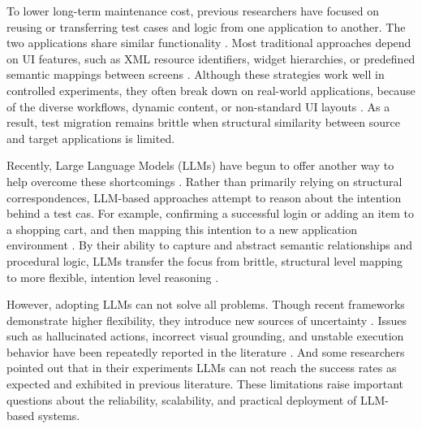 \documentclass[acmsmall,nonacm]{acmart}
\begin{document}
To lower long-term maintenance cost, previous researchers have focused on reusing or transferring test cases and logic from one application to another. The two applications share similar functionality \cite{8952228,10.1145/3650212.3680327}. Most traditional approaches depend on UI features, such as XML resource identifiers, widget hierarchies, or predefined semantic mappings between screens \cite{10.1145/3236024.3236055,8952228}. Although these strategies work well in controlled experiments, they often break down on real-world applications, because of the diverse workflows, dynamic content, or non-standard UI layouts \cite{8952228,10.1145/3650212.3680327}. As a result, test migration remains brittle when structural similarity between source and target applications is limited.

Recently, Large Language Models (LLMs) have begun to offer another way to help overcome these shortcomings \cite{10.1145/3728975,10.1145/3728978,10.1145/3236024.3236055,zhang2024surveylargelanguagemodels}. Rather than primarily relying on structural correspondences, LLM-based approaches attempt to reason about the intention behind a test cas. For example, confirming a successful login or adding an item to a shopping cart, and then mapping this intention to a new application environment \cite{10.1145/3728975,10.1145/3728978,10.1145/3726525}. By their ability to capture and abstract semantic relationships and procedural logic, LLMs transfer the focus from brittle, structural level mapping to more flexible, intention level reasoning \cite{10.1145/3728975,10.1145/3236024.3236055,zhang2024surveylargelanguagemodels}.

However, adopting LLMs can not solve all problems. Though recent frameworks demonstrate higher flexibility, they introduce new sources of uncertainty \cite{li2025reusedroidvlmempoweredandroidui,wang2024softwaretestinglargelanguage}. Issues such as hallucinated actions, incorrect visual grounding, and unstable execution behavior have been repeatedly reported in the literature \cite{baechler2024screenaivisionlanguagemodelui,li2025reusedroidvlmempoweredandroidui,wang2024softwaretestinglargelanguage,zhang2025largelanguagemodelbrainedgui}. And some researchers pointed out that in their experiments LLMs can not reach the success rates as expected and exhibited in previous literature. These limitations raise important questions about the reliability, scalability, and practical deployment of LLM-based systems.
\end{document}
